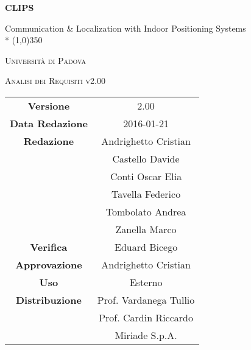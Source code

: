 \documentclass[a4paper,12pt]{article}
\author{Oscar Elia Conti, Marco Zanella}
\date{9/12/2015}
\begin{document}
	\begin{titlepage}
		\centering
		{\huge\bfseries CLIPS\par}
	Communication \& Localization with Indoor Positioning Systems \\*
	\line(1,0){350} \\
	{\scshape\LARGE Università di Padova \par}
	\vspace{1cm}
	{\scshape\Large Analisi dei Requisiti v2.00\par}
	\logo
	\newpage
		\begin{tabular}{c|c}
			{\hfill \textbf{Versione}} 			& 2.00			\\
			{\hfill\textbf{Data Redazione}} 		& 2016-01-21  		\\ 
			{\hfill\textbf{Redazione}} 			& Andrighetto Cristian \\
										& Castello Davide \\
										& Conti Oscar Elia \\
										& Tavella Federico \\
										& Tombolato Andrea \\
										& Zanella Marco \\
			{\hfill\textbf{Verifica}} 				& Eduard Bicego \\ 
			{\hfill\textbf{Approvazione}} 		& Andrighetto Cristian \\
			{\hfill\textbf{Uso}} 					& Esterno			\\
			{\hfill\textbf{Distribuzione}} 			& Prof. Vardanega Tullio \\
											& Prof. Cardin Riccardo \\
											& Miriade S.p.A. \\
		\end{tabular}
	\end{titlepage}
	\newpage
		\pagestyle{myfront}
		
	
	\newpage
		\tableofcontents
	\newpage
		\listoftables
	\newpage
		\listoffigures
	\label{LastFrontPage}
	
	\newpage
	\pagestyle{mymain}
		
	\newpage
		
	\newpage
		
	\newpage
		
	\label{LastPage}
\end{document}
